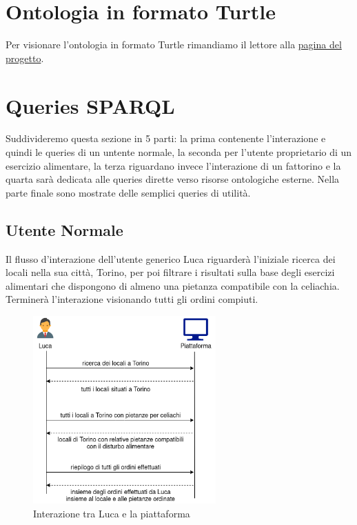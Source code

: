 \documentclass[12pt]{article}
\begin{document}
\section{Ontologia in formato Turtle}
Per visionare l'ontologia in formato Turtle rimandiamo il lettore alla \href{https://lorenzosciandra.github.io/DeliveryDoctor/}{pagina del progetto}.

\section{Queries SPARQL}
Suddivideremo questa sezione in 5 parti: la prima contenente l'interazione e quindi le queries di un untente normale, la seconda per l'utente proprietario di un esercizio alimentare, la terza riguardano invece l'interazione di un fattorino e la quarta sarà dedicata alle queries dirette verso risorse ontologiche esterne.
Nella parte finale sono mostrate delle semplici queries di utilità.

\subsection{Utente Normale}
Il flusso d'interazione dell'utente generico Luca riguarderà l'iniziale ricerca dei locali nella sua città, Torino, per poi filtrare i risultati sulla base degli esercizi alimentari che dispongono di almeno una pietanza compatibile con la celiachia. Terminerà l'interazione visionando tutti gli ordini compiuti.
\begin{figure}[H]
    \centering
         \includegraphics[width=7cm]{files/lucaInterazione.png}
    \caption{Interazione tra Luca e la piattaforma}
\end{figure}
\end{document}

